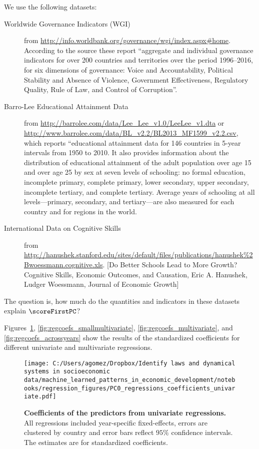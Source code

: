 We use the following datasets:
\begin{description}
	\item[Worldwide Governance Indicators (WGI)] from \url{http://info.worldbank.org/governance/wgi/index.aspx#home}. According to the source these report ``aggregate and individual governance indicators for over 200 countries and territories over the period 1996–2016, for six dimensions of governance: Voice and Accountability, Political Stability and Absence of Violence, Government Effectiveness, Regulatory Quality, Rule of Law, and Control of Corruption''.
	\item[Barro-Lee Educational Attainment Data] from \url{http://barrolee.com/data/Lee_Lee_v1.0/LeeLee_v1.dta} or \url{http://www.barrolee.com/data/BL_v2.2/BL2013_MF1599_v2.2.csv}, which reports ``educational attainment data for 146 countries in 5-year intervals from 1950 to 2010. It also provides information about the distribution of educational attainment of the adult population over age 15 and over age 25 by sex at seven levels of schooling: no formal education, incomplete primary, complete primary, lower secondary, upper secondary, incomplete tertiary, and complete tertiary. Average years of schooling at all levels---primary, secondary, and tertiary---are also measured for each country and for regions in the world. 
	\item[International Data on Cognitive Skills] from \url{http://hanushek.stanford.edu/sites/default/files/publications/hanushek\%2Bwoessmann.cognitive.xls}. [Do Better Schools Lead to More Growth? Cognitive Skills, Economic Outcomes, and Causation, Eric A. Hanushek, Ludger Woessmann, Journal of Economic Growth]
\end{description}
The question is, how much do the quantities and indicators in these datasets explain $\scoreFirstPC$?

Figures\ \ref{fig:regcoefs_univariate}, \ref{fig:regcoefs_smallmultivariate}, \ref{fig:regcoefs_multivariate}, and \ref{fig:regcoefs_acrossyears} show the results of the standardized coefficients for different univariate and multivariate regressions.
\begin{figure}[htb]
\begin{center}
\texttt{[image: C:/Users/agomez/Dropbox/Identify laws and dynamical systems in socioeconomic data/machine\_learned\_patterns\_in\_economic\_development/notebooks/regression\_figures/PC0\_regressions\_coefficients\_univariate.pdf]}
\caption{
\textbf{Coefficients of the predictors from univariate regressions.} 
 All regressions included year-specific fixed-effects, errors are clustered by country and error bars reflect $95\%$ confidence intervals. The estimates are for standardized coefficients.}
\label{fig:regcoefs_univariate}
\end{center}
\end{figure}

